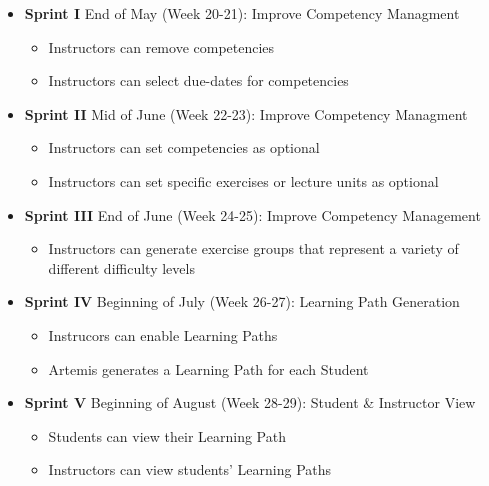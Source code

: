 \documentclass[a4paper,12pt,twoside]{article}
\begin{document}
\begin{itemize}
        \item \textbf{Sprint I} End of May (Week 20-21): Improve Competency Managment
              \begin{itemize}
                      \item Instructors can remove competencies
                      \item Instructors can select due-dates for competencies
              \end{itemize}

        \item \textbf{Sprint II} Mid of June (Week 22-23): Improve Competency Managment
              \begin{itemize}
                      \item Instructors can set competencies as optional
                      \item Instructors can set specific exercises or lecture units as optional
              \end{itemize}

        \item \textbf{Sprint III} End of June (Week 24-25): Improve Competency Management
              \begin{itemize}
                      \item Instructors can generate exercise groups that represent a variety of different difficulty levels
              \end{itemize}

        \item \textbf{Sprint IV} Beginning of July (Week 26-27): Learning Path Generation
              \begin{itemize}
                      \item Instrucors can enable Learning Paths
                      \item Artemis generates a Learning Path for each Student
              \end{itemize}

        \item \textbf{Sprint V} Beginning of August (Week 28-29): Student \& Instructor View
              \begin{itemize}
                      \item Students can view their Learning Path
                      \item Instructors can view students' Learning Paths
              \end{itemize}


\end{itemize}
\end{document}
